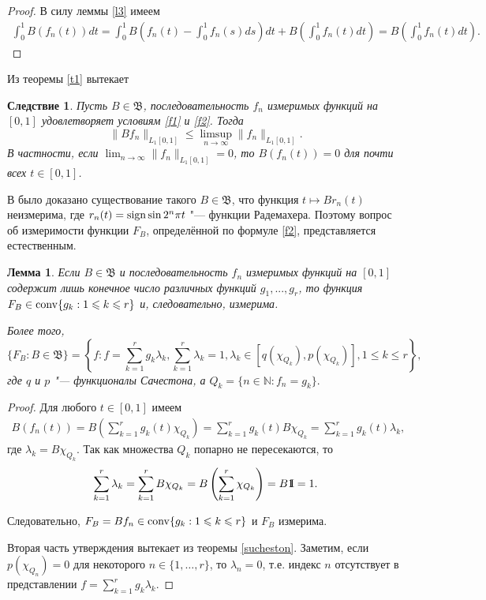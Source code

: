 \documentclass[12pt]{article}
\newcommand{\emm}{\mathrm{1\hspace{-0.3em} I}}
\newtheorem{lem}[thm]{Лемма}
\newtheorem{cor}[thm]{Следствие}
\def\N{{\mathbb{N}}}
\def\B{{\mathfrak{B}}}
\begin{document}
\begin{proof}
В силу леммы \ref{l3} имеем
\begin{align*}
\int_0^1 B(f_n(t)) dt = \int_0^1 B\left(f_n(t)-\int_0^1 f_n(s) ds\right) dt +B\left(\int_0^1 f_n(t) dt\right)= B\left(\int_0^1 f_n(t) dt\right).
\end{align*}
\end{proof}

Из теоремы \ref{t1} вытекает

\begin{cor}
Пусть $B\in \B$, последовательность $f_n$  измеримых функций на $[0,1]$  удовлетворяет условиям \eqref{f1} и  \eqref{f2}.
Тогда
$$\|Bf_n \|_{L_1[0,1]}\leqslant \limsup_{n\to\infty} \|f_n \|_{L_1[0,1]}.$$
В частности, если $\lim_{n\to\infty} \|f_n \|_{L_1[0,1]} = 0$, то $B(f_n(t))=0$ для почти всех $t\in[0,1]$.
\end{cor}

В \cite{FT} было доказано существование такого $B\in \B$, что функция $t\mapsto Br_n(t)$ неизмерима, где $r_n(t)={\rm sign} \sin 2^n\pi t$ "--- функции Радемахера. Поэтому вопрос об измеримости функции $F_B$, определённой по формуле \eqref{f2}, представляется естественным.

\begin{lem}\label{l5}
Если $B\in \B$ и последовательность $f_n$  измеримых функций на $[0,1]$ содержит лишь конечное число различных функций $g_1, ..., g_r$, то функция $F_B\in {\rm conv} \{g_k : 1\leqslant k \leqslant r\}$ и, следовательно, измерима.

Более того,
$$\{F_B: B\in \B\}= \left\{f : f=\sum_{k=1}^r g_k\lambda_k, \sum_{k=1}^r \lambda_k=1, \lambda_k \in [q(\chi_{Q_k}), p(\chi_{Q_k})],  1\leqslant k \leqslant r\right\},$$
где $q$ и $p$  "--- функционалы Сачестона, а $Q_k =\{n\in\N : f_n=g_k\}.$
\end{lem}

\begin{proof}
Для любого $t\in[0,1]$ имеем
\begin{align*}
B(f_n(t))= B\left(\sum_{k=1}^r g_k(t) \chi_{Q_k}\right)= \sum_{k=1}^r g_k(t) B\chi_{Q_k}= \sum_{k=1}^r g_k(t) \lambda_k,
\end{align*}
где $\lambda_k=B\chi_{Q_k}.$ Так как множества $Q_k$ попарно не пересекаются, то
\begin{align*}
\sum_{k=1}^r \lambda_k= \sum_{k=1}^r B\chi_{Q_k}= B\left(\sum_{k=1}^r \chi_{Q_k}\right)=B\emm=1.
\end{align*}

Следовательно, $F_B=Bf_n\in {\rm conv} \{g_k : 1\leqslant k \leqslant r\}$ и $F_B$ измерима.

Вторая часть утверждения вытекает из теоремы \ref{sucheston}. Заметим, если $p(\chi_{Q_n})=0$ для некоторого $n\in \{1, \dots, r\}$, то $\lambda_n=0$, т.е. индекс $n$ отсутствует в представлении $f=\sum_{k=1}^r g_k\lambda_k$.

\end{proof}
\end{document}
